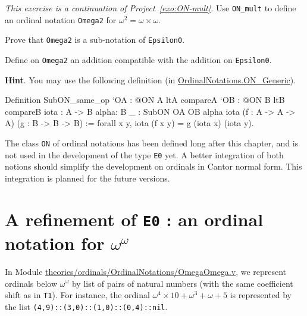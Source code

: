 \begin{project}
 \emph{This exercise is a continuation of Project~\vref{exo:ON-mult}.}
Use \texttt{ON\_mult} to define an ordinal notation \texttt{Omega2} for $\omega^2=\omega\times\omega$.

Prove that \texttt{Omega2} is a sub-notation of \texttt{Epsilon0}.

Define on \texttt{Omega2} an addition compatible with the addition on \texttt{Epsilon0}.

\textbf{Hint}. You may use the following definition (in 
    \href{../theories/html/hydras.OrdinalNotations.ON_Generic.html}{OrdinalNotations.ON\_Generic}).

    \begin{Coqsrc}
    Definition SubON_same_op  `{OA : @ON A ltA  compareA}
           `{OB : @ON B ltB  compareB}
           {iota : A -> B} 
           {alpha: B}
           {_ : SubON OA OB alpha iota}
           (f : A -> A -> A)
           (g : B -> B -> B)
      :=
      forall x y,  iota (f x y) = g (iota x) (iota y).
    \end{Coqsrc}

    \end{project}

    \begin{project}
    The class \texttt{ON} of ordinal notations has been defined long after this 
    chapter, and is not used in the development of the type \texttt{E0} yet.
    A better integration of both notions should simplify the development on ordinals in Cantor normal form. This integration is planned for the future versions.

    \end{project}

 

    \section{A refinement of \texttt{E0} : an ordinal notation for \texorpdfstring{$\omega^\omega$}{omega\^omega}}

    In Module   \href{https://github.com/coq-community/hydra-battles/blob/master/theories/ordinals/OrdinalNotations/OmegaOmega.v}{theories/ordinals/OrdinalNotations/OmegaOmega.v},
    we represent ordinals below $\omega^\omega$ by list of pairs of natural numbers (with the same coefficient shift as in \texttt{T1}).
    For instance, the ordinal $\omega^4\times 10 + \omega^3 + \omega+ 5$ is represented by the list \texttt{(4,9)::(3,0)::(1,0)::(0,4)::nil}.

